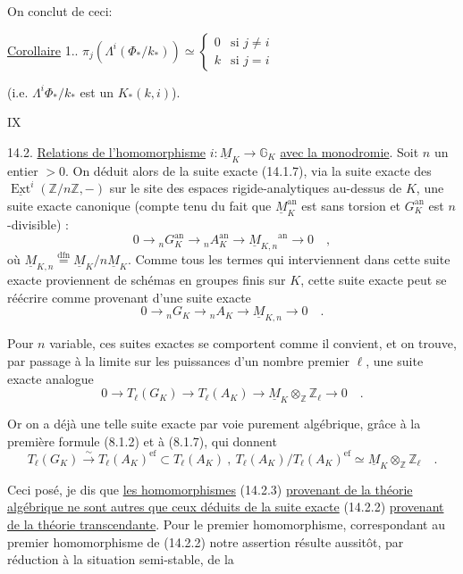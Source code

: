 On conclut de ceci:

\uline{Corollaire} 1.. \quad $\pi_j(\Lambda^i(\Phi_*/k_*))\simeq\begin{cases}0&\text{si }j\ne i\\k&\text{si }j=i\end{cases}$

(i.e. $\Lambda^i\Phi_*/k_*$ est un $K_*(k,i)$).


\hfill IX

14.2. \uline{Relations de l'homomorphisme} $i\colon\underline M_K\longrightarrow\mathbb G_K$ \uline{avec la monodromie}. Soit $n$ un entier $>0$. On déduit alors de la suite exacte (14.1.7), via la suite exacte des $\underline{\operatorname{Ext}}^i(\mathbb Z/n\mathbb Z,-)$ sur le site des espaces rigide-analytiques au-dessus de $K$, une suite exacte canonique (compte tenu du fait que $\underline M_K^{\mathrm{an}}$ est sans torsion et $G_K^{\mathrm{an}}$ est $n$-divisible) :
\[
 0\longrightarrow{}_{n}G_K^{\mathrm{an}}\longrightarrow{}_{n}A_K^{\mathrm{an}}
 \longrightarrow{\underline M_{K,n}}^{\mathrm{an}}\longrightarrow0\quad,
\]
où $\underline M_{K,n}\overset{\mathrm{dfn}}{=}\underline M_K/n\underline M_K$. Comme tous les termes qui interviennent dans\handwritten{\unsure{$\vert$}} cette suite exacte proviennent de schémas en groupes finis sur $K$, cette suite exacte peut se réécrire comme provenant d'une suite exacte
\[
 0\longrightarrow{}_{n}G_K\longrightarrow{}_{n}A_K\longrightarrow\underline M_{K,n}\longrightarrow0\quad. \tag*{(14.2.1)}
\]

Pour $n$ variable, ces suites exactes se comportent comme il convient, et on trouve, par passage à la limite sur les puissances d'un nombre premier $\ell$, une suite exacte analogue
\[
 0\longrightarrow T_\ell(G_K)\longrightarrow T_\ell(A_K)\longrightarrow
 \underline M_K\otimes_{\mathbb Z}\mathbb Z_\ell\longrightarrow0\quad. \tag*{(14.2.2)}
\]

Or on a déjà une telle suite exacte par voie purement algébrique, grâce à la première formule (8.1.2) et à (8.1.7), qui donnent
\[
 T_\ell(G_K)\xrightarrow{\sim} T_\ell(A_K)^{\mathrm{ef}}\subset T_\ell(A_K)\ ,\
 T_\ell(A_K)/T_\ell(A_K)^{\mathrm{ef}}\simeq\underline M_K\otimes_{\mathbb Z}\mathbb Z_\ell\quad. \tag*{(14.2.3)}
\]

Ceci posé, je dis que \uline{les homomorphismes} (14.2.3) \uline{provenant de la théorie algébrique ne sont autres que ceux déduits de la suite exacte} (14.2.2) \uline{provenant de la théorie transcendante}. Pour le premier homomorphisme, correspondant au premier homomorphisme de (14.2.2)\unsure{,|;} notre assertion résulte aussitôt, par réduction à la situation semi-stable, de la

